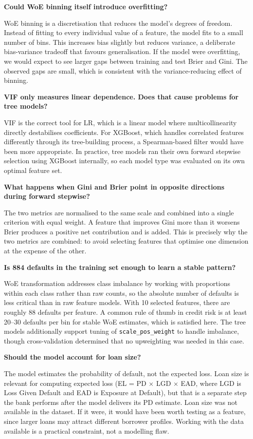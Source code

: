\documentclass[a4paper,11pt]{article}
\begin{document}
\textbf{Could WoE binning itself introduce overfitting?}

WoE binning is a discretisation that reduces the model's degrees of freedom. Instead
of fitting to every individual value of a feature, the model fits to a small number
of bins. This increases bias slightly but reduces variance, a deliberate bias-variance
tradeoff that favours generalisation. If the model were overfitting, we would expect
to see larger gaps between training and test Brier and Gini. The observed gaps are
small, which is consistent with the variance-reducing effect of binning.

\textbf{VIF only measures linear dependence. Does that cause problems for tree models?}

VIF is the correct tool for LR, which is a linear model where multicollinearity
directly destabilises coefficients. For XGBoost, which handles correlated features
differently through its tree-building process, a Spearman-based filter would have
been more appropriate. In practice, tree models ran their own forward stepwise
selection using XGBoost internally, so each model type was evaluated on its own
optimal feature set.

\textbf{What happens when Gini and Brier point in opposite directions during forward stepwise?}

The two metrics are normalised to the same scale and combined into a single criterion
with equal weight. A feature that improves Gini more than it worsens Brier produces a
positive net contribution and is added. This is precisely why the two metrics are
combined: to avoid selecting features that optimise one dimension at the expense of
the other.

\textbf{Is 884 defaults in the training set enough to learn a stable pattern?}

WoE transformation addresses class imbalance by working with proportions within each
class rather than raw counts, so the absolute number of defaults is less critical than
in raw feature models. With 10 selected features, there are roughly 88 defaults per
feature. A common rule of thumb in credit risk is at least 20--30 defaults per bin
for stable WoE estimates, which is satisfied here. The tree models additionally
support tuning of \texttt{scale\_pos\_weight} to handle imbalance, though
cross-validation determined that no upweighting was needed in this case.

\textbf{Should the model account for loan size?}

The model estimates the probability of default, not the expected loss. Loan size is
relevant for computing expected loss (EL = PD $\times$ LGD $\times$ EAD, where LGD is Loss Given Default and EAD is Exposure at Default), but that
is a separate step the bank performs after the model delivers its PD estimate. Loan
size was not available in the dataset. If it were, it would have been worth testing
as a feature, since larger loans may attract different borrower profiles. Working
with the data available is a practical constraint, not a modelling flaw.
\end{document}
